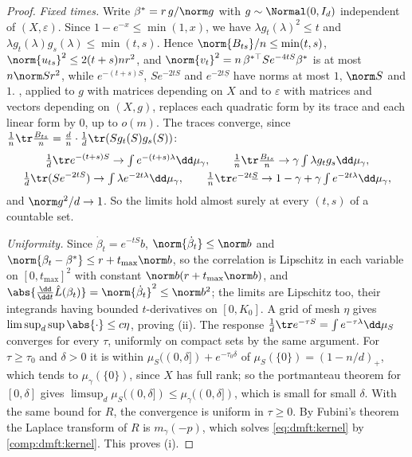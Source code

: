 \begin{refsection}
\begin{proof}
\emph{Fixed times.} Write $\beta^*=r\,g/\norm g$ with $g\sim\Normal(0,I_d)$ independent of $(X,\varepsilon)$. Since $1-e^{-x}\le\min(1,x)$, we have $\lambda g_t(\lambda)^2\le t$ and $\lambda g_t(\lambda)g_s(\lambda)\le\min(t,s)$. Hence $\norm{B_{ts}}/n\le\min(t,s)$, $\norm{u_{ts}}^2\le2(t+s)nr^2$, and $\norm{v_t}^2=n\,\beta^{*\top}Se^{-4tS}\beta^*$ is at most $n\norm Sr^2$, while $e^{-(t+s)S}$, $Se^{-2tS}$ and $e^{-2t\underline S}$ have norms at most $1$, $\norm S$ and $1$. , applied to $g$ with matrices depending on $X$ and to $\varepsilon$ with matrices and vectors depending on $(X,g)$, replaces each quadratic form by its trace and each linear form by $0$, up to $o(m)$. The traces converge, since $\frac1n\tr\frac{B_{ts}}n=\frac dn\cdot\frac1d\tr(Sg_t(S)g_s(S))$:
\begin{gather*}
\tfrac1d\tr e^{-(t+s)S}\to\textstyle\int e^{-(t+s)\lambda}\dd\mu_\gamma,\qquad\tfrac1n\tr\tfrac{B_{ts}}n\to\gamma\textstyle\int\lambda g_tg_s\dd\mu_\gamma,\\
\tfrac1d\tr(Se^{-2tS})\to\textstyle\int\lambda e^{-2t\lambda}\dd\mu_\gamma,\qquad\tfrac1n\tr e^{-2t\underline S}\to1-\gamma+\gamma\textstyle\int e^{-2t\lambda}\dd\mu_\gamma,
\end{gather*}
and $\norm g^2/d\to1$. So the limits hold almost surely at every $(t,s)$ of a countable set.

\emph{Uniformity.} Since $\dot\beta_t=e^{-tS}b$, $\norm{\dot\beta_t}\le\norm b$ and $\norm{\beta_t-\beta^*}\le r+t_{\max}\norm b$, so the correlation is Lipschitz in each variable on $[0,t_{\max}]^2$ with constant $\norm b(r+t_{\max}\norm b)$, and $\abs{\frac{\dd}{\dd t}\hat L(\beta_t)}=\norm{\dot\beta_t}^2\le\norm b^2$; the limits are Lipschitz too, their integrands having bounded $t$-derivatives on $[0,K_0]$. A grid of mesh $\eta$ gives $\limsup_d\sup\abs{\cdot}\le c\eta$, proving (ii). The response $\frac1d\tr e^{-\tau S}=\int e^{-\tau\lambda}\dd\mu_S$ converges for every $\tau$, uniformly on compact sets by the same argument. For $\tau\ge\tau_0$ and $\delta>0$ it is within $\mu_S((0,\delta])+e^{-\tau_0\delta}$ of $\mu_S(\{0\})=(1-n/d)_+$, which tends to $\mu_\gamma(\{0\})$, since $X$ has full rank; so the portmanteau theorem for $[0,\delta]$ gives $\limsup_d\mu_S((0,\delta])\le\mu_\gamma((0,\delta])$, which is small for small $\delta$. With the same bound for $R$, the convergence is uniform in $\tau\ge0$. By Fubini's theorem the Laplace transform of $R$ is $m_\gamma(-p)$, which solves \eqref{eq:dmft:kernel} by \cref{comp:dmft:kernel}. This proves (i).


\end{proof}
\end{refsection}
